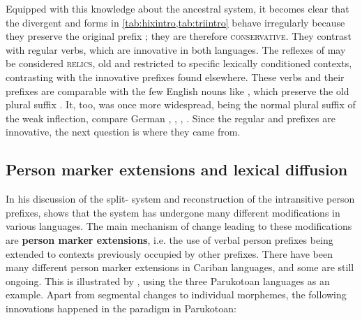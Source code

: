 Equipped with this knowledge about the ancestral system, it becomes clear that the divergent \hixka and \trio forms in \cref{tab:hixintro,tab:triintro} behave irregularly because they preserve the original \PC {} prefix ; they are therefore \textsc{conservative}.
They contrast with regular  verbs, which are innovative in both languages.
The reflexes of  may be considered \textsc{relics}, old and restricted to specific lexically conditioned contexts, contrasting with the innovative prefixes found elsewhere.
These verbs and their prefixes are comparable with the few English nouns like , which preserve the old plural suffix .
It, too, was once more widespread, being the normal plural suffix of the weak inflection, compare German  ,  ,  ,  .
Since the regular \hixka and \trio prefixes are innovative, the next question is where they came from.


%

\subsection{Person marker extensions and lexical diffusion}
\label{sec:extensions_intro}
In his discussion of the \PC split- system and reconstruction of the intransitive person prefixes, \textcite[88--96]{gildea1998} shows that the system has undergone many different modifications in various languages.
The main mechanism of change leading to these modifications are \textbf{person marker extensions}, i.e. the use of verbal person prefixes being extended to contexts previously occupied by other prefixes.
There have been many different person marker extensions in Cariban languages, and some are still ongoing.
This is illustrated by \textcite{gildea1998}, using the three Parukotoan languages as an example.
Apart from segmental changes to individual morphemes, the following innovations happened in the \setone paradigm in Parukotoan:

